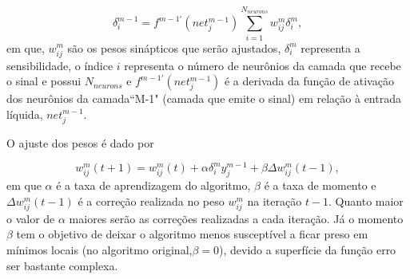 \begin{equation}
\label{eq:sensibiliy_function}
\delta^{m-1}_i = f^{m-1'}(net^{m-1}_j)\sum_{i=1}^{N_{neurons}}w^m_{ij}\delta^m_i,
\end{equation}
em que, $w^m_{ij}$ são os pesos sinápticos que serão ajustados, $\delta^m_i$ \label{symbol:sensibilidade} representa a sensibilidade, o índice $i$ representa o número de neurônios da camada que recebe o sinal e possui $N_{neurons}$ e $f^{m-1'}(net^{m-1}_j)$ é a derivada da função de ativação dos neurônios da camada``M-1" (camada que emite o sinal) em relação à entrada líquida, $net^{m-1}_j$.

O ajuste dos pesos é dado por

\begin{equation}
\label{eq:backpropagation_function}
w^m_{ij}(t+1) = w^m_{ij}(t) + \alpha \delta^m_i y^{m-1}_j + \beta \Delta w^m_{ij}(t-1),
\end{equation}
em que $\alpha$ é a taxa de aprendizagem do algoritmo, $\beta$ é a taxa de momento e $\Delta w^m_{ij}(t-1)$ é a correção realizada no peso $w_{ij}^m$ \label{symbol:WIJ} na iteração $t-1$. Quanto maior o valor de $\alpha$ maiores serão as correções realizadas a cada iteração. Já o momento $\beta$ tem o objetivo de deixar o algoritmo menos susceptível a ficar preso em mínimos locais (no algoritmo original,$\beta = 0$), devido a superfície da função erro ser bastante complexa.

